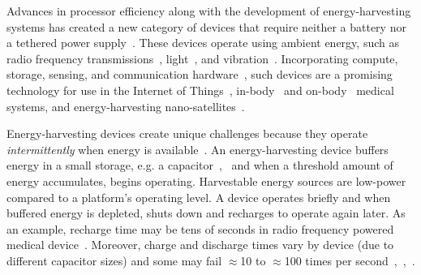 Advances in processor efficiency along with the development of energy-harvesting systems has created a new category of devices that require neither a battery nor a tethered power supply~\cite{prasad_comst_2014,lucia_snapl_2017,soyata_csm_2016}. These devices operate using ambient energy, such as radio frequency transmissions~\cite{rf_powered_computing_gollakota_2014}, light~\cite{margolies_infocom_2016,margolies_tosn_2016}, and vibration~\cite{gorlatova_sigmetrics_2014}. Incorporating compute, storage, sensing, and communication hardware~\cite{wisp5,moo}, such devices are a promising technology for use in the Internet of Things~\cite{ku_cst_2016}, in-body~\cite{nadeau_naturebio_2017} and on-body~\cite{bandodkar_electroanalysis_2015} medical systems, and energy-harvesting nano-satellites~\cite{kicksat}.

Energy-harvesting devices create unique challenges because they operate {\em intermittently} when energy is available~\cite{hicks_isca_2017,lucia_snapl_2017}. An
energy-harvesting device buffers energy in a small storage, e.g. a capacitor~\cite{gorlatova_tmc_2013},~\cite{gunduz_commag_2014} and when a threshold amount of energy accumulates, begins operating. Harvestable energy sources are low-power compared to a platform's operating level. A device operates briefly and when buffered energy is depleted, shuts down and recharges to operate again later. As an example, recharge time may be tens of seconds in radio frequency powered medical device~\cite[Fig. 3c]{nadeau_naturebio_2017}. Moreover, charge and discharge times vary by device (due to different capacitor sizes) and some may fail $\approx$10 to $\approx$100 times per second~\cite{tan_infocom_2016},~\cite{mementos},~\cite{nvp}.


